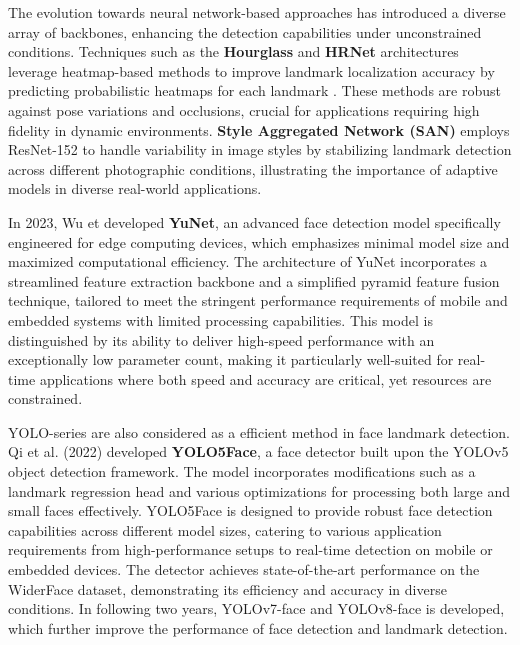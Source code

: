 The evolution towards neural network-based approaches has introduced a diverse array of backbones, enhancing the detection capabilities under unconstrained conditions. Techniques such as the \textbf{Hourglass} \cite{Newell_2016_ECCV} and \textbf{HRNet} \cite{Sun_2019_CVPR} architectures leverage heatmap-based methods to improve landmark localization accuracy by predicting probabilistic heatmaps for each landmark . These methods are robust against pose variations and occlusions, crucial for applications requiring high fidelity in dynamic environments.
\textbf{Style Aggregated Network (SAN)}\cite{Dong_2018_CVPR} employs ResNet-152 \cite{He_2016_CVPR} to handle variability in image styles by stabilizing landmark detection across different photographic conditions, illustrating the importance of adaptive models in diverse real-world applications.

In 2023, Wu et developed \textbf{YuNet}\cite{Wu_2023}, an advanced face detection model specifically engineered for edge computing devices, which emphasizes minimal model size and maximized computational efficiency. The architecture of YuNet incorporates a streamlined feature extraction backbone and a simplified pyramid feature fusion technique, tailored to meet the stringent performance requirements of mobile and embedded systems with limited processing capabilities. This model is distinguished by its ability to deliver high-speed performance with an exceptionally low parameter count, making it particularly well-suited for real-time applications where both speed and accuracy are critical, yet resources are constrained.

YOLO-series are also considered as a efficient method in face landmark detection. Qi et al. (2022) developed \textbf{YOLO5Face}\cite{Qi2022YOLO5Face}, a face detector built upon the YOLOv5 object detection framework. The model incorporates modifications such as a landmark regression head and various optimizations for processing both large and small faces effectively. YOLO5Face is designed to provide robust face detection capabilities across different model sizes, catering to various application requirements from high-performance setups to real-time detection on mobile or embedded devices. The detector achieves state-of-the-art performance on the WiderFace dataset, demonstrating its efficiency and accuracy in diverse conditions. In following two years, YOLOv7-face\cite{YOLOv7Face} and YOLOv8-face\cite{YOLOv8Face} is developed, which further improve the performance of face detection and landmark detection.

